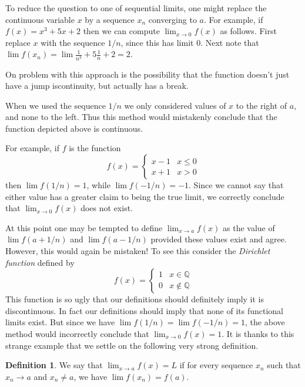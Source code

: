 \documentclass[11pt,oneside]{amsbook}
\newcommand{\Q}{\mathbb Q}
\theoremstyle{definition}
\theoremstyle{plain}
\theoremstyle{definition}
\newtheorem{definition}[theorem]{Definition}
\theoremstyle{remark}
\numberwithin{equation}{section}
\numberwithin{figure}{section}
\begin{document}
To reduce the question to one of sequential limits, one might replace the continuous variable $x$ by a sequence $x_n$ converging to $a$. For example, if $f(x)=x^3+5x+2$ then we can compute $\lim_{x\to0}f(x)$ as follows. First replace $x$ with the sequence $1/n$, since this has limit $0$. Next note that $\lim f(x_n)=\lim \frac{1}{n^3}+5\frac{1}{n}+2=2$.

On problem with this approach is the possibility that the function doesn't just have a jump iscontinuity, but actually has a break.
\begin{center}
\end{center}
When we used the sequence $1/n$ we only considered values of $x$ to the right of $a$, and none to the left. Thus this method would mistakenly conclude that the function depicted above is continuous.

For example, if $f$ is the function
\[f(x)=\begin{cases}x-1&x\leq0\\x+1&x>0\end{cases}
\]
then $\lim f(1/n)=1$, while $\lim f(-1/n)=-1$. Since we cannot say that either value has a greater claim to being the true limit, we correctly conclude that $\lim_{x\to0}f(x)$ does not exist.

At this point one may be tempted to define $\lim_{x\to a}f(x)$ as the value of $\lim f(a+1/n)$ and $\lim f(a-1/n)$ provided these values exist and agree. However, this would again be mistaken! To see this consider the \emph{Dirichlet function} defined by
\[f(x)=\begin{cases}1&x\in\Q\\0&x\notin\Q\end{cases}
\]
This function is so ugly that our definitions should definitely imply it is discontinuous. In fact our definitions should imply that none of its functional limits exist. But since we have $\lim f(1/n)=\lim f(-1/n)=1$, the above method would incorrectly conclude that $\lim_{x\to0}f(x)=1$. It is thanks to this strange example that we settle on the following very strong definition.

\begin{definition}
  We say that $\lim_{x\to a}f(x)=L$ if for every sequence $x_n$ such that $x_n\to a$ and $x_n\neq a$, we have $\lim f(x_n)=f(a)$.
\end{definition}
\end{document}
